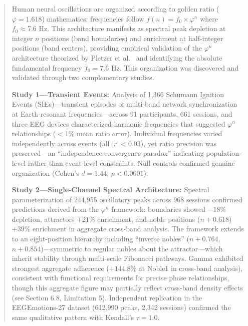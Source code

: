 \documentclass[11pt,a4paper]{article}
\newcommand{\phisym}{\varphi}
\begin{document}
\begin{abstract}
Human neural oscillations are organized according to golden ratio ($\phisym = 1.618$) mathematics: frequencies follow $f(n) = f_0 \times \phisym^n$ where $f_0 \approx 7.6$ Hz. This architecture manifests as spectral peak depletion at integer $n$ positions (band boundaries) and enrichment at half-integer positions (band centers), providing empirical validation of the $\phisym^n$ architecture theorized by Pletzer et al.\ \parencite{pletzer2010golden} and identifying the absolute fundamental frequency $f_0 = 7.6$ Hz. This organization was discovered and validated through two complementary studies.

\textbf{Study 1---Transient Events:} Analysis of 1,366 Schumann Ignition Events (SIEs)---transient episodes of multi-band network synchronization at Earth-resonant frequencies---across 91 participants, 661 sessions, and three EEG devices characterized harmonic frequencies that suggested $\phisym^n$ relationships ($<$1\% mean ratio error). Individual frequencies varied independently across events (all $|r| < 0.03$), yet ratio precision was preserved---an ``independence-convergence paradox'' indicating population-level rather than event-level constraints. Null controls confirmed genuine organization (Cohen's $d = 1.44$, $p < 0.0001$).

\textbf{Study 2---Single-Channel Spectral Architecture:} Spectral parameterization of 244,955 oscillatory peaks across 968 sessions confirmed predictions derived from the $\phisym^n$ framework: boundaries showed $-18\%$ depletion, attractors $+21\%$ enrichment, and noble positions ($n + 0.618$) $+39\%$ enrichment in aggregate cross-band analysis. The framework extends to an eight-position hierarchy including ``inverse nobles'' ($n + 0.764$, $n + 0.854$)---symmetric to regular nobles about the attractor---which inherit stability through multi-scale Fibonacci pathways. Gamma exhibited strongest aggregate adherence ($+144.8\%$ at Noble1 in cross-band analysis), consistent with functional requirements for precise phase relationships, though this aggregate figure may partially reflect cross-band density effects (see Section 6.8, Limitation 5). Independent replication in the EEGEmotions-27 dataset \parencite{huy2025eeg} (612,990 peaks, 2,342 sessions) confirmed the same qualitative pattern with Kendall's $\tau = 1.0$.


\end{abstract}
\end{document}
